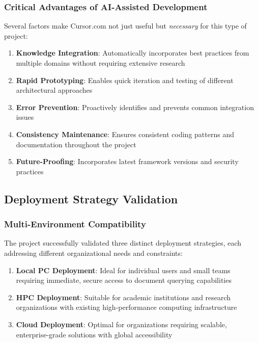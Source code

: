 \documentclass[12pt,letterpaper]{article}
\begin{document}
\subsubsection{Critical Advantages of AI-Assisted Development}

Several factors make Cursor.com not just useful but \textit{necessary} for this type of project:

\begin{enumerate}
    \item \textbf{Knowledge Integration}: Automatically incorporates best practices from multiple domains without requiring extensive research
    \item \textbf{Rapid Prototyping}: Enables quick iteration and testing of different architectural approaches
    \item \textbf{Error Prevention}: Proactively identifies and prevents common integration issues
    \item \textbf{Consistency Maintenance}: Ensures consistent coding patterns and documentation throughout the project
    \item \textbf{Future-Proofing}: Incorporates latest framework versions and security practices
\end{enumerate}

\subsection{Deployment Strategy Validation}

\subsubsection{Multi-Environment Compatibility}

The project successfully validated three distinct deployment strategies, each addressing different organizational needs and constraints:

\begin{enumerate}
    \item \textbf{Local PC Deployment}: Ideal for individual users and small teams requiring immediate, secure access to document querying capabilities
    \item \textbf{HPC Deployment}: Suitable for academic institutions and research organizations with existing high-performance computing infrastructure
    \item \textbf{Cloud Deployment}: Optimal for organizations requiring scalable, enterprise-grade solutions with global accessibility
\end{enumerate}
\end{document}
